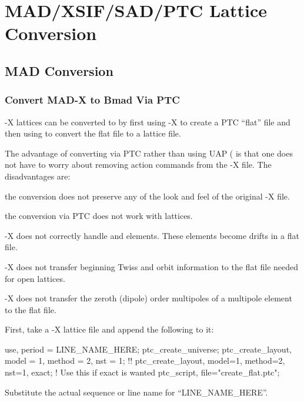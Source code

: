 \chapter{MAD/XSIF/SAD/PTC Lattice Conversion}
\label{c:lat.convert}

\section{MAD Conversion}
\label{s:mad.convert}

\subsection{Convert MAD-X to Bmad Via PTC}
\label{s:mad.bmad.ptc}

\mad-X lattices can be converted to \bmad by first using \mad-X to create a PTC ``flat''
file and then using \bmad to convert the flat file to a \bmad lattice file. 

The advantage of converting via PTC rather than using UAP ( is that
one does not have to worry about removing action commands from the \mad-X file. The
disadvantages are:
  \begin{description}
  \item 
the conversion does not preserve any of the look and feel of the original \mad-X file. 
  \item
the conversion via PTC does not work with  lattices.
  \item
\mad-X does not correctly handle  and  elements. These
elements become drifts in a flat file.
  \item
\mad-X does not transfer beginning Twiss and orbit information to the flat file needed for open lattices.
  \item
\mad-X does not transfer the zeroth (dipole) order multipoles of a multipole element to the flat file.
  \end{description}


First, take a \mad-X lattice file and append the following to it:
\begin{example}
  use, period = LINE_NAME_HERE;
  ptc_create_universe;
  ptc_create_layout, model = 1, method = 2, nst = 1; 
  !! ptc_create_layout, model=1, method=2, nst=1, exact;  ! Use this if exact is wanted
  ptc_script, file="create_flat.ptc";
\end{example}
Substitute the actual sequence or line name for ``LINE_NAME_HERE''.

